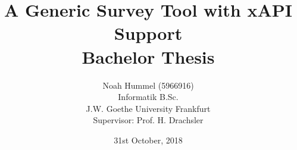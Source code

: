     \rfoot{\thepage}

    \title{A Generic Survey Tool with xAPI Support \\ Bachelor Thesis \\ }
    \date{31st October, 2018}
    \author{Noah Hummel (5966916) \\ Informatik B.Sc. \\ J.W. Goethe University Frankfurt \\ Supervisor: Prof. H. Drachsler}
    

    \newcommand{\namesigdate}[2][5cm]{%
        \begin{minipage}{#1}
            #2 \vspace{1.0cm}\hrule\smallskip
            \small \textit{Signature}
            \vspace{1.0cm}\hrule\smallskip
            \small \textit{Date}
        \end{minipage}
    }

    \newcommand{\addstretch}[1]{\addtolength{#1}{\fill}}
    \newenvironment{onepage}
      {\newpage\flushbottom
       \addstretch{\baselineskip}
       \addstretch{\abovedisplayskip}
       \addstretch{\abovedisplayshortskip}
       \addstretch{\belowdisplayskip}
       \addstretch{\belowdisplayshortskip}
       \setlength{\parskip}{0pt}}
      {\newpage}

    \DeclarePairedDelimiter\abs{\lvert}{\rvert}

    \newcommand{\profhd}{Prof. H. Drachsler }

    \def\inline{\lstinline[basicstyle=\ttfamily,keywordstyle={}]}

    \newcommand{\zcomp}{\underline{Z}}
    \newcommand{\cmp}[1]{\underline{#1}}